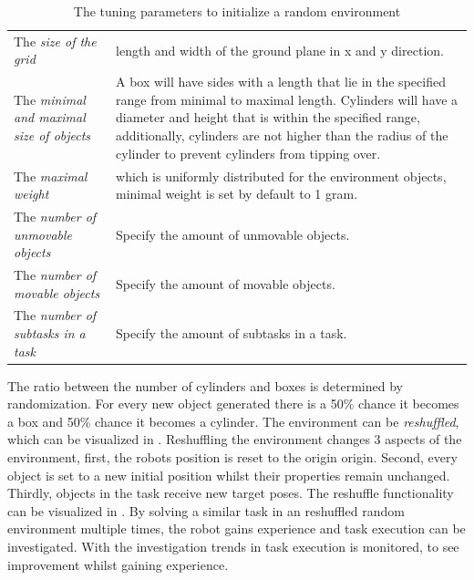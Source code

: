 \noindent
\begin{table}[H]
\caption{The tuning parameters to initialize a random environment}%
\label{table:configure_rand_env}
\centering
\begin{tabular}%
{>{\raggedright\arraybackslash}p{}%
>{\raggedright\arraybackslash}p{}}
The \textit{size of the grid} & length and width of the ground plane in \gls{x} and \gls{y} direction.\\
The \textit{minimal and maximal size of objects} & A box will have sides with a length that lie in the specified range from minimal to maximal length. Cylinders will have a diameter and height that is within the specified range, additionally, cylinders are not higher than the radius of the cylinder to prevent cylinders from tipping over. \\
The \textit{maximal weight} & which is uniformly distributed for the environment objects, minimal weight is set by default to 1 gram. \\
The \textit{number of unmovable objects} & Specify the amount of unmovable objects.\\
The \textit{number of movable objects} & Specify the amount of movable objects.\\
The \textit{number of subtasks in a task} & Specify the amount of subtasks in a task.
\end{tabular}
\end{table}

The ratio between the number of cylinders and boxes is determined by randomization. For every new object generated there is a 50\% chance it becomes a box and 50\% chance it becomes a cylinder. The environment can be \textit{reshuffled}, which can be visualized in . Reshuffling the environment changes 3 aspects of the environment, first, the robots position is reset to the origin \gls{origin}. Second, every object is set to a new initial position whilst their properties remain unchanged. Thirdly, objects in the task receive new target poses.  The reshuffle functionality can be visualized in . By solving a similar task in an reshuffled random environment multiple times, the robot gains experience and task execution can be investigated. With the investigation trends in task execution is monitored, to see improvement whilst gaining experience.\bs


